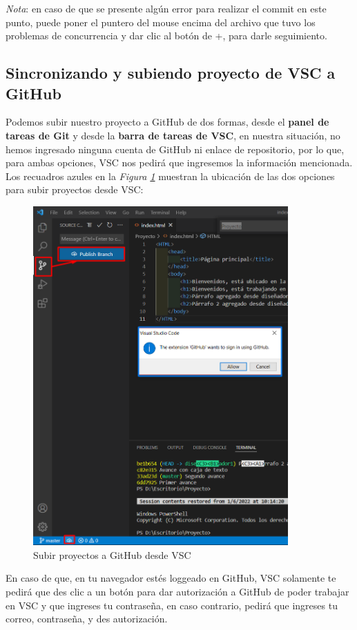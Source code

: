 \textit{Nota}: en caso de que se presente algún error para realizar el commit en este punto, puede poner el puntero del mouse encima del archivo que tuvo los problemas de concurrencia y dar clic al botón de +, para darle seguimiento.


\subsection{Sincronizando y subiendo proyecto de VSC a GitHub}
\hspace{0.55cm}Podemos subir nuestro proyecto a GitHub de dos formas, desde el \textbf{panel de tareas de Git} y desde la \textbf{barra de tareas de VSC}, en nuestra situación, no hemos ingresado ninguna cuenta de GitHub ni enlace de repositorio, por lo que, para ambas opciones, VSC nos pedirá que ingresemos la información mencionada. Los recuadros azules en la \textit{Figura \ref{fig: 27}} muestran la ubicación de las dos opciones para subir proyectos desde VSC:
\begin{figure}[H]
    \centering
    \caption{Subir proyectos a GitHub desde VSC}
    \label{fig: 27}
    \includegraphics[height=13cm]{capturas/subir_proyecto1.png}
\end{figure}

En caso de que, en tu navegador estés loggeado en GitHub, VSC solamente te pedirá que des clic a un botón para dar autorización a GitHub de poder trabajar en VSC y que ingreses tu contraseña, en caso contrario, pedirá que ingreses tu correo, contraseña, y des autorización.

